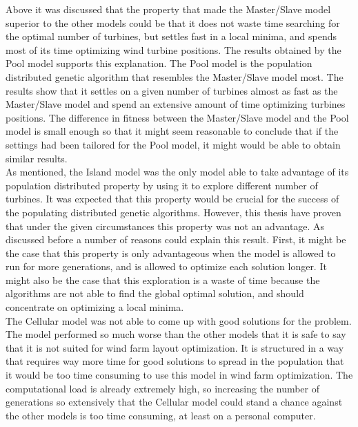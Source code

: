 \noindent Above it was discussed that the property that made the Master/Slave model superior to the other models could be that it does not waste time searching for the optimal number of turbines, but settles fast in a local minima, and spends most of its time optimizing wind turbine positions. The results obtained by the Pool model supports this explanation. The Pool model is the population distributed genetic algorithm that resembles the Master/Slave model most. The results show that it settles on a given number of turbines almost as fast as the Master/Slave model and spend an extensive amount of time optimizing turbines positions. The difference in fitness between the Master/Slave model and the Pool model is small enough so that it might seem reasonable to conclude that if the settings had been tailored for the Pool model, it might would be able to obtain similar results.\\


\noindent As mentioned, the Island model was the only model able to take advantage of its population distributed property by using it to explore different number of turbines. It was expected that this property would be crucial for the success of the populating distributed genetic algorithms. However, this thesis have proven that under the given circumstances this property was not an advantage. As discussed before a number of reasons could explain this result. First, it might be the case that this property is only advantageous when the model is allowed to run for more generations, and is allowed to optimize each solution longer. It might also be the case that this exploration is a waste of time because the algorithms are not able to find the global optimal solution, and should concentrate on optimizing a local minima.\\


\noindent The Cellular model was not able to come up with good solutions for the problem. The model performed so much worse than the other models that it is safe to say that it is not suited for wind farm layout optimization. It is structured in a way that requires way more time for good solutions to spread in the population that it would be too time consuming to use this model in wind farm optimization. The computational load is already extremely high, so increasing the number of generations so extensively that the Cellular model could stand a chance against the other models is too time consuming, at least on a personal computer. \\


